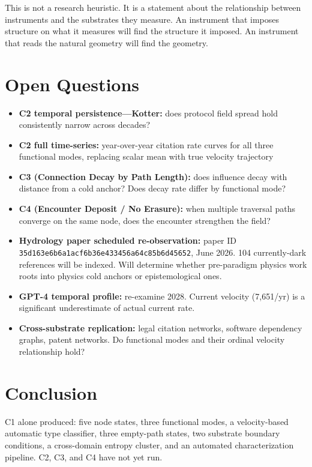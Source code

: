 \documentclass[11pt]{article}
\begin{document}
This is not a research heuristic. It is a statement about the relationship between instruments and the substrates they measure. An instrument that imposes structure on what it measures will find the structure it imposed. An instrument that reads the natural geometry will find the geometry.

\section{Open Questions}

\begin{itemize}
\item \textbf{C2 temporal persistence---Kotter:} does protocol field spread hold consistently narrow across decades?
\item \textbf{C2 full time-series:} year-over-year citation rate curves for all three functional modes, replacing scalar mean with true velocity trajectory
\item \textbf{C3 (Connection Decay by Path Length):} does influence decay with distance from a cold anchor? Does decay rate differ by functional mode?
\item \textbf{C4 (Encounter Deposit / No Erasure):} when multiple traversal paths converge on the same node, does the encounter strengthen the field?
\item \textbf{Hydrology paper scheduled re-observation:} paper ID \texttt{35d163e6b6a1acf6b36e433456a64c85b6d45652}, June 2026. 104 currently-dark references will be indexed. Will determine whether pre-paradigm physics work roots into physics cold anchors or epistemological ones.
\item \textbf{GPT-4 temporal profile:} re-examine 2028. Current velocity (7,651/yr) is a significant underestimate of actual current rate.
\item \textbf{Cross-substrate replication:} legal citation networks, software dependency graphs, patent networks. Do functional modes and their ordinal velocity relationship hold?
\end{itemize}

\section{Conclusion}

C1 alone produced: five node states, three functional modes, a velocity-based automatic type classifier, three empty-path states, two substrate boundary conditions, a cross-domain entropy cluster, and an automated characterization pipeline. C2, C3, and C4 have not yet run.
\end{document}
